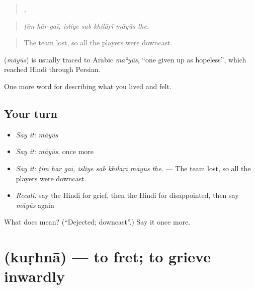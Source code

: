 \begin{quote}
  ,     
\end{quote}

\begin{quote}
\emph{ṭīm hār gaī, isliye sab khilāṛī māyūs the.}
\end{quote}

\begin{quote}
The team lost, so all the players were downcast.
\end{quote}

\begin{cousinweb}
\textbf{} (\emph{māyūs}) is usually traced to Arabic \emph{maʾyūs}, \textquotedblleft{}one given up as hopeless\textquotedblright{}, which reached Hindi through Persian.
\end{cousinweb}

\begin{grammarlens}[title={What you've built}]
One more word for describing what you lived and felt.
\end{grammarlens}

\subsection*{Your turn}
\begin{itemize}
\raggedright
  \item \emph{Say it:} \emph{māyūs}
  \item \emph{Say it:} \emph{māyūs}, once more
  \item \emph{Say it:} \emph{ṭīm hār gaī, isliye sab khilāṛī māyūs the.} — The team lost, so all the players were downcast.
  \item \emph{Recall:} say the Hindi for grief, then the Hindi for disappointed, then say \emph{māyūs} again
\end{itemize}

\begin{tcolorbox}[breakable,colback=teal!4,colframe=teal!35!black,title={Before you move on}]
What does  mean? (\textquotedblleft{}Dejected; downcast\textquotedblright{}.) Say it once more.
\end{tcolorbox}
\section[\texorpdfstring{\hi{कुढ़ना} (kuṛhnā)}{कुढ़ना (kuṛhnā)}]{ (kuṛhnā) — to fret; to grieve inwardly}

